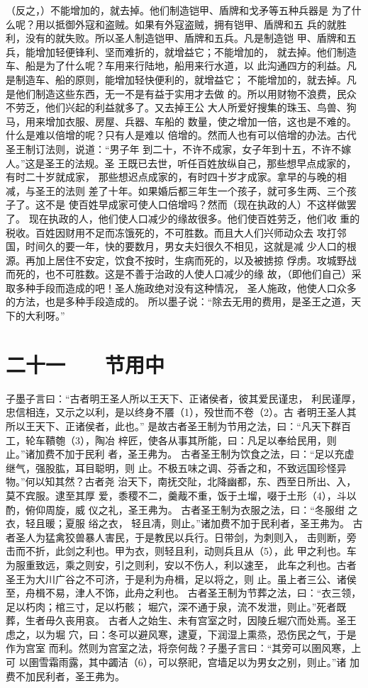 \documentclass[12pt,UTF8]{ctexbook}
\begin{document}
（反之，）不能增加的，就去掉。他们制造铠甲、盾牌和戈矛等五种兵器是 
为了什么呢？用以抵御外寇和盗贼。如果有外寇盗贼，拥有铠甲、盾牌和五 
兵的就胜利，没有的就失败。所以圣人制造铠甲、盾牌和五兵。凡是制造铠 
甲、盾牌和五兵，能增加轻便锋利、坚而难折的，就增益它；不能增加的， 
就去掉。他们制造车、船是为了什么呢？车用来行陆地，船用来行水道，以 
此沟通四方的利益。凡是制造车、船的原则，能增加轻快便利的，就增益它； 
不能增加的，就去掉。凡是他们制造这些东西，无一不是有益于实用才去做 
的。所以用财物不浪费，民众不劳乏，他们兴起的利益就多了。又去掉王公 
大人所爱好搜集的珠玉、鸟兽、狗马，用来增加衣服、房屋、兵器、车船的 
数量，使之增加一倍，这也是不难的。什么是难以倍增的呢？只有人是难以 
倍增的。然而人也有可以倍增的办法。古代圣王制订法则，说道：“男子年 
到二十，不许不成家，女子年到十五，不许不嫁人。”这是圣王的法规。圣 
王既已去世，听任百姓放纵自己，那些想早点成家的，有时二十岁就成家， 
那些想迟点成家的，有时四十岁才成家。拿早的与晚的相减，与圣王的法则 
差了十年。如果婚后都三年生一个孩子，就可多生两、三个孩子了。这不是 
使百姓早成家可使人口倍增吗？然而（现在执政的人）不这样做罢了。 
现在执政的人，他们使人口减少的缘故很多。他们使百姓劳乏，他们收 
重的税收。百姓因财用不足而冻饿死的，不可胜数。而且大人们兴师动众去 
攻打邻国，时间久的要一年，快的要数月，男女夫妇很久不相见，这就是减 
少人口的根源。再加上居住不安定，饮食不按时，生病而死的，以及被掳掠 
俘虏。攻城野战而死的，也不可胜数。这是不善于治政的人使人口减少的缘 
故，（即他们自己）采取多种手段而造成的吧！圣人施政绝对没有这种情况， 
圣人施政，他使人口众多的方法，也是多种手段造成的。 
所以墨子说：“除去无用的费用，是圣王之道，天下的大利呀。” 

\chapter{二十一　　节用中}

子墨子言曰：“古者明王圣人所以王天下、正诸侯者，彼其爱民谨忠， 
利民谨厚，忠信相连，又示之以利，是以终身不餍（1），殁世而不卷（2）。古 
者明王圣人其所以王天下、正诸侯者，此也。” 
是故古者圣王制为节用之法，曰：“凡天下群百工，轮车鞼匏（3），陶冶 
梓匠，使各从事其所能，曰：凡足以奉给民用，则止。”诸加费不加于民利 
者，圣王弗为。 
古者圣王制为饮食之法，曰：“足以充虚继气，强股肱，耳目聪明，则 
止。不极五味之调、芬香之和，不致远国珍怪异物。”何以知其然？古者尧 
治天下，南抚交阯，北降幽都，东、西至日所出、入，莫不宾服。逮至其厚 
爱，黍稷不二，羹胾不重，饭于土塯，啜于土形（4），斗以酌，俯仰周旋，威 
仪之礼，圣王弗为。 
古者圣王制为衣服之法，曰：“冬服绀 之衣，轻且暖；夏服 绤之衣， 
轻且凊，则止。”诸加费不加于民利者，圣王弗为。 
古者圣人为猛禽狡兽暴人害民，于是教民以兵行。日带剑，为刺则入， 
击则断，旁击而不折，此剑之利也。甲为衣，则轻且利，动则兵且从（5），此 
甲之利也。车为服重致远，乘之则安，引之则利，安以不伤人，利以速至， 
此车之利也。古者圣王为大川广谷之不可济，于是利为舟楫，足以将之，则 
止。虽上者三公、诸侯至，舟楫不易，津人不饰，此舟之利也。 
古者圣王制为节葬之法，曰：“衣三领，足以朽肉；棺三寸，足以朽骸； 
堀穴，深不通于泉，流不发泄，则止。”死者既葬，生者毋久丧用哀。 
古者人之始生、未有宫室之时，因陵丘堀穴而处焉。圣王虑之，以为堀 
穴，曰：冬可以避风寒，逮夏，下润湿上熏烝，恐伤民之气，于是作为宫室 
而利。然则为宫室之法，将奈何哉？子墨子言曰：“其旁可以圉风寒，上可 
以圉雪霜雨露，其中蠲洁（6），可以祭祀，宫墙足以为男女之别，则止。”诸 
加费不加民利者，圣王弗为。 
\end{document}
